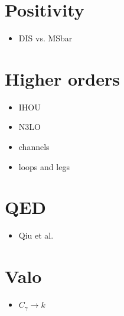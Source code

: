 \section{Positivity}
\begin{itemize}
    \item DIS vs. MSbar
\end{itemize}

\section{Higher orders}
\begin{itemize}
    \item IHOU
    \item N3LO
    \item channels
    \item loops and legs
\end{itemize}

\section{QED}
\begin{itemize}
    \item Qiu et al.
\end{itemize}

\section{Valo}
\begin{itemize}
    \item $C_\gamma \to k$
\end{itemize}

